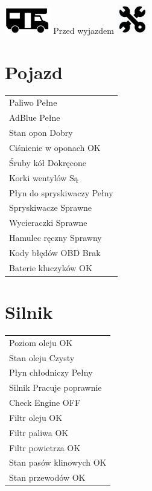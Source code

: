 \documentclass{article}
\date{}
\begin{document}
\begin{center}
\includegraphics[width=0.15\textwidth]{camper.png}
\hfill
\Huge{Przed wyjazdem}
\hfill
\includegraphics[width=0.1\textwidth]{preparation.png}
\end{center}



\begin{multicols}{2}



\section{Pojazd}
\begin{tabularx}{\columnwidth}{|X|}
\hline
Paliwo \dotfill Pełne \\
AdBlue \dotfill Pełne \\
Stan opon \dotfill Dobry \\
Ciśnienie w oponach \dotfill OK \\
Śruby kół \dotfill Dokręcone \\
Korki wentylów \dotfill Są \\
Płyn do spryskiwaczy \dotfill Pełny \\
Spryskiwacze \dotfill Sprawne \\
Wycieraczki \dotfill Sprawne \\
Hamulec ręczny \dotfill Sprawny \\
Kody błędów OBD \dotfill Brak \\
Baterie kluczyków \dotfill OK \\
\hline
\end{tabularx}

\section{Silnik}
\begin{tabularx}{\columnwidth}{|X|}
\hline
Poziom oleju \dotfill OK \\
Stan oleju \dotfill Czysty \\
Płyn chłodniczy \dotfill Pełny \\
Silnik \dotfill Pracuje poprawnie \\
Check Engine \dotfill OFF \\
Filtr oleju \dotfill OK \\
Filtr paliwa \dotfill OK \\
Filtr powietrza \dotfill OK \\
Stan pasów klinowych \dotfill OK \\
Stan przewodów \dotfill OK \\
\hline
\end{tabularx}


\end{multicols}
\end{document}
